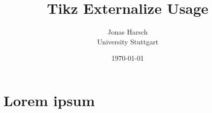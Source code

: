 \documentclass[a4paper]{article}
\begin{document}
	
	\title{Tikz Externalize Usage}
	\date{\today}
	\author{Jonas Harsch \\ University Stuttgart}
	
	\clearpage\maketitle
	\thispagestyle{empty}
	
	\newpage
	
	\section{Lorem ipsum}
	
	\lipsum[1]
	
\end{document}
